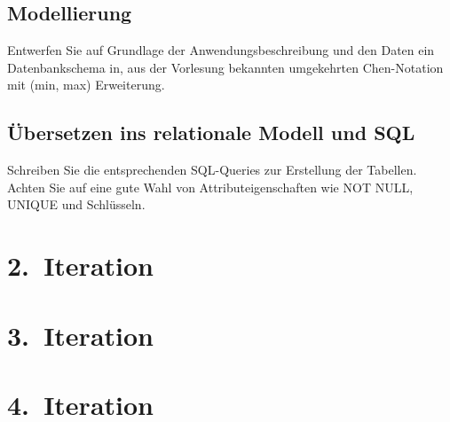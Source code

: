 \documentclass[
10pt,
a4paper
]{scrartcl}
\begin{document}
\subsection{Modellierung}
Entwerfen Sie auf Grundlage der Anwendungsbeschreibung und den Daten ein Datenbankschema in, aus der Vorlesung bekannten umgekehrten Chen-Notation mit (min, max) Erweiterung.

\subsection{\"{U}bersetzen ins relationale Modell und SQL}
Schreiben Sie die entsprechenden SQL-Queries zur Erstellung der Tabellen. Achten Sie auf eine gute Wahl von Attributeigenschaften wie NOT NULL, UNIQUE und Schl\"{u}sseln.

\section{2.~Iteration}

\section{3.~Iteration}

\section{4.~Iteration}
\end{document}
